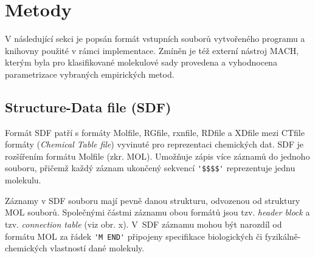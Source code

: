 \chapter{Metody}
V následující sekci je popsán formát vstupních souborů vytvořeného programu a kni\-hov\-ny použité v rámci implementace. Zmíněn je  též externí nástroj MACH, kterým byla pro klasifikované molekulové sady provedena a vyhodnocena parametrizace vybraných empirických metod. 

\section{Structure-Data file (SDF)}
Formát SDF \cite{sdf_pdf, sdf_clanek} patří s formáty Molfile, RGfile, rxnfile, RDfile a XDfile mezi CTfile formáty (\textit{Chemical Table file})  vyvinuté pro reprezentaci chemických dat. SDF je rozšířením formátu Molfile (zkr. MOL). 
Umožňuje zápis více záznamů do jednoho souboru, přičemž každý záznam ukončený sekvencí \verb|'$$$$'| reprezentuje jednu molekulu. 

Záznamy v SDF souboru mají pevně danou strukturu, odvozenou od struktury MOL souborů. Společnými  částmi záznamu obou formátů jsou tzv. \textit{header block} a tzv. \textit{connection table} (viz obr. x). %
V~SDF záznamu mohou být narozdíl od formátu MOL za řádek \verb|'M END'| připojeny specifikace biologických či fyzikálně-che\-mic\-kých vlastností dané molekuly. 

